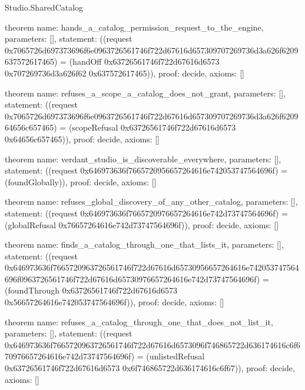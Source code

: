 \begin{lexlean}{Studio.SharedCatalog}
\begin{semanticmodule}
theorem{
  name: hands_a_catalog_permission_request_to_the_engine,
  parameters: [],
  statement: ((request 0x7065726d697373696f6e0963726561746f722d67616d657309707269736d3a626f6209637572617465) = (handOff 0x63726561746f722d67616d6573 0x707269736d3a626f62 0x637572617465)),
  proof: decide{},
  axioms: []
}

theorem{
  name: refuses_a_scope_a_catalog_does_not_grant,
  parameters: [],
  statement: ((request 0x7065726d697373696f6e0963726561746f722d67616d657309707269736d3a626f620964656c657465) = (scopeRefusal 0x63726561746f722d67616d6573 0x64656c657465)),
  proof: decide{},
  axioms: []
}

theorem{
  name: verdant_studio_is_discoverable_everywhere,
  parameters: [],
  statement: ((request 0x646973636f7665720956657264616e742053747564696f) = (foundGlobally)),
  proof: decide{},
  axioms: []
}

theorem{
  name: refuses_global_discovery_of_any_other_catalog,
  parameters: [],
  statement: ((request 0x646973636f7665720976657264616e742d73747564696f) = (globalRefusal 0x76657264616e742d73747564696f)),
  proof: decide{},
  axioms: []
}

theorem{
  name: finds_a_catalog_through_one_that_lists_it,
  parameters: [],
  statement: ((request 0x646973636f7665720963726561746f722d67616d65730956657264616e742053747564696f0963726561746f722d67616d65730976657264616e742d73747564696f) = (foundThrough 0x63726561746f722d67616d6573 0x56657264616e742053747564696f)),
  proof: decide{},
  axioms: []
}

theorem{
  name: refuses_a_catalog_through_one_that_does_not_list_it,
  parameters: [],
  statement: ((request 0x646973636f7665720963726561746f722d67616d6573096f746865722d636174616c6f670976657264616e742d73747564696f) = (unlistedRefusal 0x63726561746f722d67616d6573 0x6f746865722d636174616c6f67)),
  proof: decide{},
  axioms: []
}
\end{semanticmodule}
\end{lexlean}
